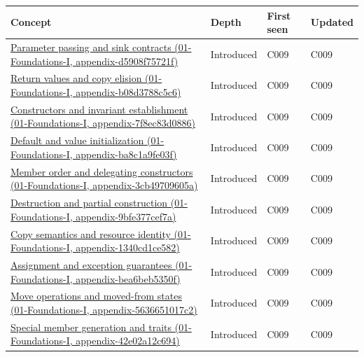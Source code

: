 {\def\LTcaptype{none} %
\begin{longtable}[]{@{}
  >{\raggedright\arraybackslash}p{}
  >{\raggedright\arraybackslash}p{}
  >{\raggedright\arraybackslash}p{}
  >{\raggedright\arraybackslash}p{}@{}}
\toprule\noalign{}
\begin{minipage}[b]{\linewidth}\raggedright
Concept
\end{minipage} & \begin{minipage}[b]{\linewidth}\raggedright
Depth
\end{minipage} & \begin{minipage}[b]{\linewidth}\raggedright
First seen
\end{minipage} & \begin{minipage}[b]{\linewidth}\raggedright
Updated
\end{minipage} \\
\midrule\noalign{}
\endhead
\bottomrule\noalign{}
\endlastfoot
\href{}{Parameter passing and sink contracts (01-Foundations-I, appendix-d5908f75721f)} & Introduced & C009 & C009 \\
\href{}{Return values and copy elision (01-Foundations-I, appendix-b08d3788c5c6)} & Introduced & C009 & C009 \\
\href{}{Constructors and invariant establishment (01-Foundations-I, appendix-7f8ec83d0886)} & Introduced & C009 & C009 \\
\href{}{Default and value initialization (01-Foundations-I, appendix-ba8c1a9fe03f)} & Introduced & C009 & C009 \\
\href{}{Member order and delegating constructors (01-Foundations-I, appendix-3cb49709605a)} & Introduced & C009 & C009 \\
\href{}{Destruction and partial construction (01-Foundations-I, appendix-9bfe377cef7a)} & Introduced & C009 & C009 \\
\href{}{Copy semantics and resource identity (01-Foundations-I, appendix-1340cd1ce582)} & Introduced & C009 & C009 \\
\href{}{Assignment and exception guarantees (01-Foundations-I, appendix-bea6beb5350f)} & Introduced & C009 & C009 \\
\href{}{Move operations and moved-from states (01-Foundations-I, appendix-5636651017c2)} & Introduced & C009 & C009 \\
\href{}{Special member generation and traits (01-Foundations-I, appendix-42e02a12c694)} & Introduced & C009 & C009 \\

\end{longtable}}
